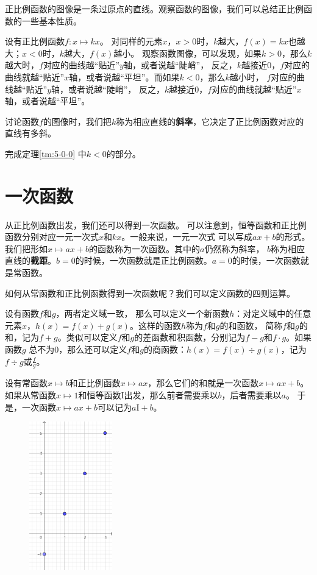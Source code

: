 \documentclass[12pt,UTF8]{ctexbook}
\begin{document}
正比例函数的图像是一条过原点的直线。观察函数的图像，我们可以总结正比例函数的一些基本性质。

设有正比例函数$f: x\mapsto kx$。
对同样的元素$x$，$x>0$时，$k$越大，$f(x) = kx$也越大；$x<0$时，$k$越大，$f(x)$越小。
观察函数图像，可以发现，如果$k>0$，那么$k$越大时，$f$对应的曲线越“贴近”$y$轴，或者说越“陡峭”，
反之，$k$越接近$0$，$f$对应的曲线就越“贴近”$x$轴，或者说越“平坦”。而如果$k<0$，那么$k$越小时，
$f$对应的曲线越“贴近”$y$轴，或者说越“陡峭”，
反之，$k$越接近$0$，$f$对应的曲线就越“贴近”$x$轴，或者说越“平坦”。

讨论函数$f$的图像时，我们把$k$称为相应直线的\textbf{斜率}，它决定了正比例函数对应的直线有多斜。

\begin{xt}\label{xt:5-0-0}
    完成定理\ref{tm:5-0-0} 中$k<0$的部分。
\end{xt}

\section{一次函数}
从正比例函数出发，我们还可以得到一次函数。
可以注意到，恒等函数和正比例函数分别对应一元一次式$x$和$kx$。一般来说，一元一次式
可以写成$ax+b$的形式。我们把形如$x \mapsto ax + b$的函数称为一次函数。其中的$a$仍然称为斜率，
$b$称为相应直线的\textbf{截距}。$b=0$的时候，一次函数就是正比例函数。$a=0$的时候，一次函数就是常函数。

如何从常函数和正比例函数得到一次函数呢？我们可以定义函数的四则运算。

设有函数$f$和$g$，两者定义域一致，
那么可以定义一个新函数$h$：对定义域中的任意元素$x$，$h(x) = f(x) + g(x)$。这样的函数$h$称为$f$和$g$的和函数，
简称$f$和$g$的和，记为$f + g$。类似可以定义$f$和$g$的差函数和积函数，分别记为$f - g$和$f\cdot g$。如果函数$g$
总不为$0$，那么还可以定义$f$和$g$的商函数：$h(x) = f(x) \div g(x)$，记为$f \div g$或$\frac{f}{g}$。

设有常函数$x\mapsto b$和正比例函数$x\mapsto ax$，那么它们的和就是一次函数$x\mapsto ax + b$。
如果从常函数$x\mapsto 1$和恒等函数$\mathrm{I}$出发，那么前者需要乘以$b$，后者需要乘以$a$。
于是，一次函数$x \mapsto ax + b$可以记为$a\mathrm{I} +b$。

\begin{figure} %
    \vspace{-10pt}
    \flushright
    \includegraphics[width=0.32\textwidth]{tu/一次函数1.png}
\end{figure}
\end{document}
